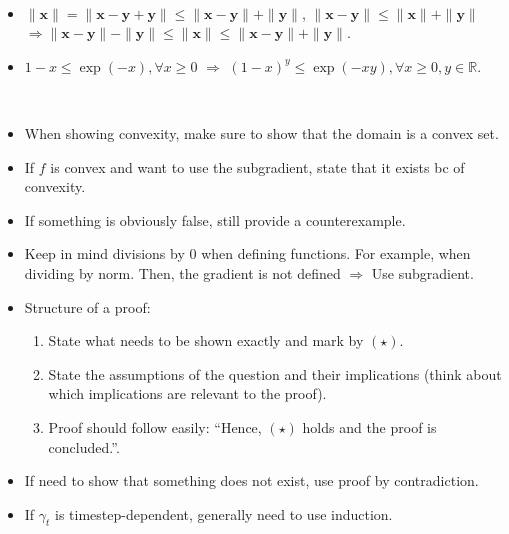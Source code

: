 \documentclass[8pt,a4paper]{extarticle}
\newcommand{\R}{\mathbb{R}}
\renewcommand{\vec}[1]{\bm{#1}}
\newenvironment{topic}[1]
{\textbf{\sffamily \colorbox{black}{\rlap{\textbf{\textcolor{white}{#1}}}\hspace{\linewidth}\hspace{-2\fboxsep}}} \\ \vspace{0.2cm}}
{}
\begin{document}
\begin{multicols*}{2}
\begin{topic}{Common tricks}
\begin{itemize}
            \item $\| \vec{x} \| = \| \vec{x} - \vec{y} + \vec{y} \| \leq \| \vec{x} - \vec{y} \| + \| \vec{y} \|$, $\| \vec{x} - \vec{y} \| \leq \| \vec{x} \| + \| \vec{y} \|$ \\
                  $\Rightarrow \| \vec{x} - \vec{y} \| - \| \vec{y} \| \leq \| \vec{x} \| \leq \| \vec{x} - \vec{y} \| + \| \vec{y} \|$.
            \item $1 - x \leq \exp(-x), \forall x \geq 0$ $\Rightarrow$ $(1-x)^y \leq \exp(-xy), \forall x \geq 0, y \in \R$.
        \end{itemize}
    \end{topic}

    \begin{topic}{IMPORTANT TIPS TO KEEP IN MIND}
        \begin{itemize}
            \item When showing convexity, make sure to show that the domain is a convex set.
            \item If $f$ is convex and want to use the subgradient, state that it exists bc of convexity.
            \item If something is obviously false, still provide a counterexample.
            \item Keep in mind divisions by $0$ when defining functions. For example, when dividing by norm. Then,
                  the gradient is not defined $\Rightarrow$ Use subgradient.
            \item Structure of a proof:
                  \begin{enumerate}
                      \item State what needs to be shown exactly and mark by $(\star)$.
                      \item State the assumptions of the question and their implications (think about which implications are
                            relevant to the proof).
                      \item Proof should follow easily: ``Hence, $(\star)$ holds and the proof is concluded.''.
                  \end{enumerate}
            \item If need to show that something does not exist, use proof by contradiction.
            \item If $\gamma_t$ is timestep-dependent, generally need to use induction.
        \end{itemize}
    \end{topic}


\end{multicols*}
\end{document}
